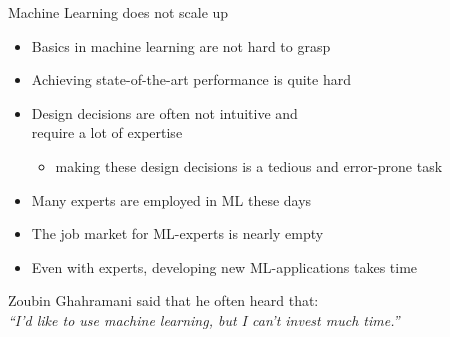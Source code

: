 \begin{frame}[c]{Machine Learning does not scale up}

\begin{itemize}
  \item Basics in machine learning are not hard to grasp
  \smallskip
  \pause
  \item Achieving state-of-the-art performance is quite hard
  \smallskip
  \pause
  \item Design decisions are often not intuitive and\\ require a lot of expertise
  \begin{itemize}
    \item making these design decisions is a tedious and error-prone task
  \end{itemize}
  \pause
  \smallskip
  \item Many experts are employed in ML these days
  \smallskip
  \pause
  \smallskip
  \item The job market for ML-experts is nearly empty
  \smallskip
  \pause
  \item Even with experts, developing new ML-applications takes time
\end{itemize}

\pause
\bigskip

Zoubin Ghahramani said that he often heard that:\\
\hfill \textit{``I'd like to use machine learning, but I can't invest much time.''}



\end{frame}






